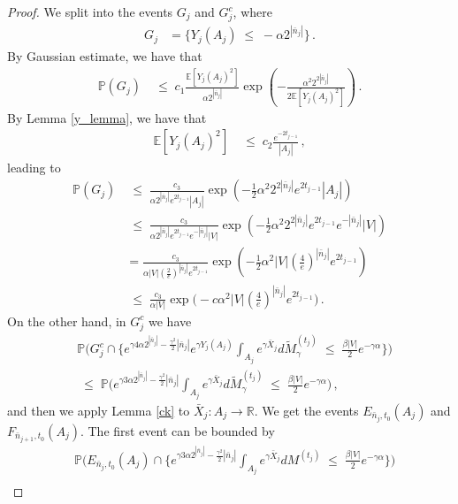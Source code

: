 \documentclass[11pt]{article}
\numberwithin{equation}{section}
\theoremstyle{definition}
\renewcommand{\tilde}{\widetilde}          %
\renewcommand{\leq}{\;\leqslant\;}                   %
\newcommand{\R}{\mathbb{R}}
\newcommand{\E}{\mathbb{E}}
\renewcommand{\P}{\mathbb{P}}
\newcommand{\ab}{|}
\newcommand{\Pb}{\P}
\begin{document}
\begin{proof}

We split into the events $G_j$ and $G_j^c$, where
\begin{align*}
G_j &= \{ Y_j(A_j) \leq - \alpha 2^{|\bar n_j|} \}\,.
\end{align*}
By Gaussian estimate, we have that
\begin{align*}
\Pb(G_j) &\leq  c_1 \frac{\E[Y_j(A_j)^2]}{\alpha 2^{|\bar n_j|}} \exp \left( -  \frac{\alpha^2 2^{2|\bar n_j|}}{2 \E[ Y_j(A_j)^2]} \right)\,.
\end{align*}
By Lemma \ref{y_lemma}, we have that
\begin{align*}
\E[ Y_j(A_j)^2] & \leq c_2 \frac{e^{-2 t_{j-1}}}{\ab A_j \ab }\,,
\end{align*}
leading to 
\begin{align*}
\Pb(G_j) &\leq \frac{c_3}{\alpha 2^{|\bar n_j|} e^{2 t_{j-1}} |A_j|} \exp( - \tfrac 12 \alpha^2 2^{2|\bar n_j|} e^{2t_{j-1}} |A_j| ) \\
& \leq \frac{c_3}{\alpha 2^{|\bar n_j|} e^{2 t_{j-1}} e^{-|\bar n_j|}|V|} \exp(- \tfrac 12 \alpha^2 2^{2|\bar n_j|} e^{2 t_{j-1} } e^{-|\bar n_j|} \ab V \ab   ) \\
&  = \frac{c_3}{\alpha |V|  ( \frac{2}{e})^{|\bar n_j|} e^{2 t_{j-1}} } \exp(- \tfrac 12 \alpha^2 \ab V \ab  (\tfrac{4}{e})^{| \bar n_j|} e^{2t_{j-1}}) \\
& \leq \frac{c_3}{\alpha |V|} \exp \big( - c \alpha^2 |V| (\tfrac{4}{e})^{|\bar n_j|} e^{2 t_{j-1}} \big)\,.
\end{align*}
On the other hand, in $G_j^c$ we have 
\begin{align*}
& \Pb \big( G_j^c \cap \{ e^{\gamma 4 \alpha 2^{| \bar n_{j} | }  - \frac{\gamma^2}{2} |\bar n_{j}| } e^{\gamma Y_{j}(A_j)}\int_{A_{j}} e^{\gamma \bar X_{j}} d \tilde M_\gamma^{(t_{j})} \leq \tfrac{\beta \ab V \ab }{2} e^{-\gamma \alpha} \} \big) \\
& \leq \Pb \big( e^{\gamma 3 \alpha 2^{| \bar n_{j} | }  - \frac{\gamma^2}{2} |\bar n_{j}| } \int_{A_{j}} e^{\gamma \bar X_{j}} d \tilde M_\gamma^{(t_{j})} \leq \tfrac{\beta \ab V \ab }{2} e^{-\gamma \alpha} \big)\,,
\end{align*}
and then we apply Lemma \ref{ck} to $\bar X_j: A_j \to \R$. We get the events $E_{\bar n_j, t_0}(A_j)$ and $F_{\bar n_{j+1}, t_0}(A_j)$. The first event can be bounded by
\begin{align*}
& \Pb \big( E_{\bar n_j, t_0}(A_j) \cap \{ e^{\gamma 3 \alpha 2^{| \bar n_{j} | }  - \frac{\gamma^2}{2} |\bar n_{j}| } \int_{A_{j}} e^{\gamma \bar X_{j}} d M^{(t_{j})} \leq \tfrac{\beta \ab V \ab }{2} e^{-\gamma \alpha} \} \big) \\

\end{align*}
\end{proof}
\end{document}
